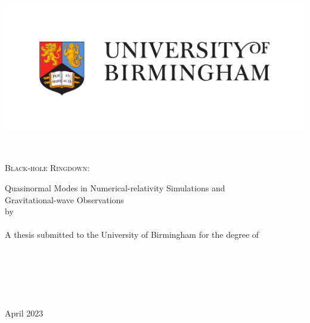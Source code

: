 \documentclass[
12pt, %
english, %
doublespacing, %
headsepline, %
]{MastersDoctoralThesis} %
\author{Eliot Finch} %
\begin{document}


\frontmatter %

\pagestyle{plain} %

\begin{singlespacing}


\begin{titlepage}
\begin{center}

\includegraphics[width=0.8\columnwidth]{Figures/full-colour-logo.pdf}

\HRule \\[0.2cm] %
{\scshape\huge Black-hole Ringdown:\par}\vspace{0.4cm} %
Quasinormal Modes in Numerical-relativity Simulations and \\
Gravitational-wave Observations\vspace{0.1cm}
\HRule \\[1.cm] %

by\\[0.9cm]
{\scshape \large \authorname}\\[2.cm]

A thesis submitted to the University of Birmingham for the degree of \\[0.1cm]
{\textsc \degreename}\\[2cm]

\vfill

\begin{flushright} \normalsize
\groupname\\
\deptname\\
\facname\\
\univname\\[0.7cm]
April 2023


\end{flushright}
\end{center}
\end{titlepage}
\end{singlespacing}
\end{document}
